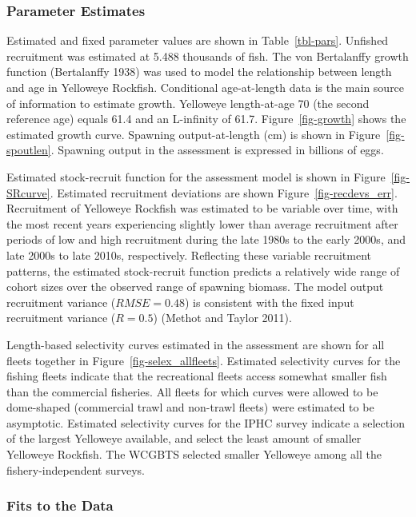 \documentclass[
]{scrartcl}
\begin{document}
\subsubsection{Parameter Estimates}\label{parameter-estimates}

Estimated and fixed parameter values are shown in Table~\ref{tbl-pars}.
Unfished recruitment was estimated at 5.488 thousands of fish. The von
Bertalanffy growth function (Bertalanffy 1938) was used to model the
relationship between length and age in Yelloweye Rockfish. Conditional
age-at-length data is the main source of information to estimate growth.
Yelloweye length-at-age 70 (the second reference age) equals 61.4 and an
L-infinity of 61.7. Figure~\ref{fig-growth} shows the estimated growth
curve. Spawning output-at-length (cm) is shown in
Figure~\ref{fig-spoutlen}. Spawning output in the assessment is
expressed in billions of eggs.

Estimated stock-recruit function for the assessment model is shown in
Figure~\ref{fig-SRcurve}. Estimated recruitment deviations are shown
Figure~\ref{fig-recdevs_err}. Recruitment of Yelloweye Rockfish was
estimated to be variable over time, with the most recent years
experiencing slightly lower than average recruitment after periods of
low and high recruitment during the late 1980s to the early 2000s, and
late 2000s to late 2010s, respectively. Reflecting these variable
recruitment patterns, the estimated stock-recruit function predicts a
relatively wide range of cohort sizes over the observed range of
spawning biomass. The model output recruitment variance
(\(RMSE = 0.48\)) is consistent with the fixed input recruitment
variance (\(R = 0.5\)) (Methot and Taylor 2011).

Length-based selectivity curves estimated in the assessment are shown
for all fleets together in Figure~\ref{fig-selex_allfleets}. Estimated
selectivity curves for the fishing fleets indicate that the recreational
fleets access somewhat smaller fish than the commercial fisheries. All
fleets for which curves were allowed to be dome-shaped (commercial trawl
and non-trawl fleets) were estimated to be asymptotic. Estimated
selectivity curves for the IPHC survey indicate a selection of the
largest Yelloweye available, and select the least amount of smaller
Yelloweye Rockfish. The WCGBTS selected smaller Yelloweye among all the
fishery-independent surveys.

\subsubsection{Fits to the Data}\label{sec-fits}
\end{document}
